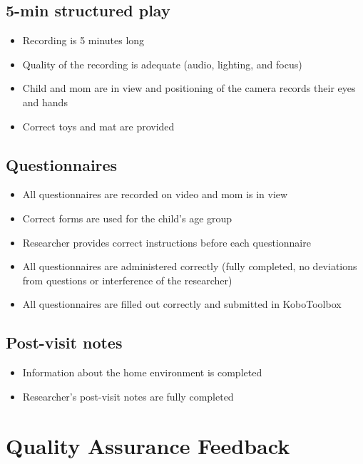 \documentclass[
  12pt,
]{book}
\providecommand{\tightlist}{%
  \setlength{\itemsep}{0pt}\setlength{\parskip}{0pt}}
\begin{document}
\hypertarget{min-structured-play}{%
\subsection{5-min structured play}\label{min-structured-play}}

\begin{itemize}
\tightlist
\item
  Recording is 5 minutes long
\item
  Quality of the recording is adequate (audio, lighting, and focus)
\item
  Child and mom are in view and positioning of the camera records their eyes and hands
\item
  Correct toys and mat are provided
\end{itemize}

\hypertarget{questionnaires-2}{%
\subsection{Questionnaires}\label{questionnaires-2}}

\begin{itemize}
\tightlist
\item
  All questionnaires are recorded on video and mom is in view
\item
  Correct forms are used for the child's age group
\item
  Researcher provides correct instructions before each questionnaire
\item
  All questionnaires are administered correctly (fully completed, no deviations from questions or interference of the researcher)
\item
  All questionnaires are filled out correctly and submitted in KoboToolbox
\end{itemize}

\hypertarget{post-visit-notes}{%
\subsection{Post-visit notes}\label{post-visit-notes}}

\begin{itemize}
\tightlist
\item
  Information about the home environment is completed
\item
  Researcher's post-visit notes are fully completed
\end{itemize}

\hypertarget{quality-assurance-feedback}{%
\section{Quality Assurance Feedback}\label{quality-assurance-feedback}}
\end{document}
